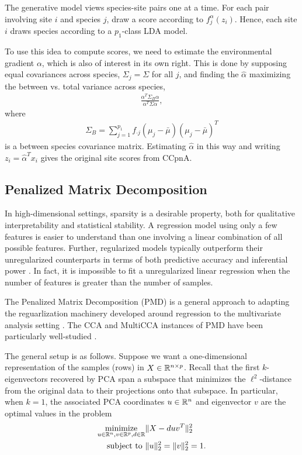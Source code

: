 \documentclass[utf8]{frontiersFPHY} %
\begin{document}
The generative model views species-site pairs one at a time. For each pair
involving site $i$ and species $j$, draw a score according to
$f_{j}^{\alpha}\left(z_{i}\right)$. Hence, each site $i$ draws species according
to a $p_{1}$-class LDA model.

To use this idea to compute scores, we need to estimate the environmental
gradient $\alpha$, which is also of interest in its own right. This is done by
supposing equal covariances across species, $\Sigma_{j} = \Sigma$ for all $j$,
and finding the $\hat{\alpha}$ maximizing the between vs. total variance across
species,
\begin{align*}
  \frac{\alpha^{T} \Sigma_{B} \alpha}{\alpha^{T} \Sigma \alpha},
\end{align*}
where
\begin{align*}
  \Sigma_{B} = \sum_{j = 1}^{p_{1}} f_{\cdot j}\left(\mu_{j} -
  \bar{\mu}\right)\left(\mu_{j} - \bar{\mu}\right)^{T}
\end{align*}
is a between species covariance matrix. Estimating $\hat{\alpha}$ in this way
and writing $z_{i} = \hat{\alpha}^{T}x_{i}$ gives the original site scores from
CCpnA.

\subsection{Penalized Matrix Decomposition}
\label{subsec:pmd}

In high-dimensional settings, sparsity is a desirable property, both for
qualitative interpretability and statistical stability. A regression model using
only a few features is easier to understand than one involving a linear
combination of all possible features. Further, regularized models typically
outperform their unregularized counterparts in terms of both predictive accuracy
and inferential power \citep{buhlmann2011statistics}. In fact, it is impossible
to fit a unregularized linear regression when the number of features is greater
than the number of samples.

The Penalized Matrix Decomposition (PMD) is a general approach to adapting the
reguarlization machinery developed around regression to the multivariate
analysis setting \citep{witten2009penalized}. The CCA and MultiCCA instances of
PMD have been particularly well-studied \citep{witten2009penalized,
  witten2013package}.

The general setup is as follows. Suppose we want a one-dimensional
representation of the samples (rows) in $X \in \mathbb{R}^{n \times p}$. Recall that
the first $k$-eigenvectors recovered by PCA span a subspace that minimizes the
$\ell^{2}$-distance from the original data to their projections onto that
subspace. In particular, when $k = 1$, the associated PCA coordinates $u \in
\mathbb{R}^{n}$ and eigenvector $v$ are the optimal values in the problem
\begin{align*}
  \mathop\mathrm{minimize}_{u \in \mathbb{R}^{n}, v \in \mathbb{R}^{p}, d \in \mathbb{R}} &\|X -
  duv^{T}\|_{2}^{2} \\ \text{subject to } &\|u\|_{2}^{2} = \|v\|_{2}^{2} = 1.
\end{align*}
\end{document}
